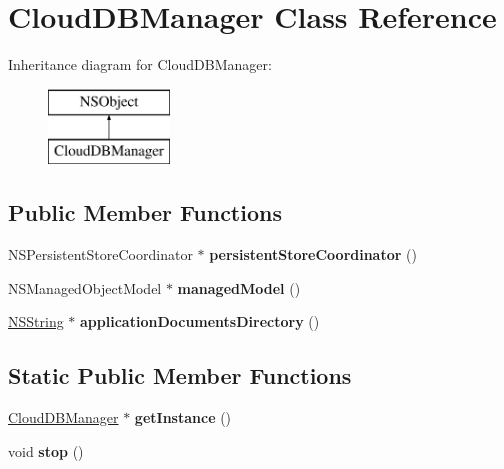 \hypertarget{interface_cloud_d_b_manager}{
\section{\-Cloud\-D\-B\-Manager \-Class \-Reference}
\label{interface_cloud_d_b_manager}
}
\-Inheritance diagram for \-Cloud\-D\-B\-Manager\-:\begin{figure}[H]
\begin{center}
\leavevmode
\includegraphics[height=2.000000cm]{interface_cloud_d_b_manager}
\end{center}
\end{figure}
\subsection*{\-Public \-Member \-Functions}
\begin{DoxyCompactItemize}
\item 
\hypertarget{interface_cloud_d_b_manager_a6cd9c78a9538f72c2a5948939c737094}{
\-N\-S\-Persistent\-Store\-Coordinator $\ast$ {\bfseries persistent\-Store\-Coordinator} ()}
\label{interface_cloud_d_b_manager_a6cd9c78a9538f72c2a5948939c737094}

\item 
\hypertarget{interface_cloud_d_b_manager_abbab662a92defb3dce9caed61b819bd0}{
\-N\-S\-Managed\-Object\-Model $\ast$ {\bfseries managed\-Model} ()}
\label{interface_cloud_d_b_manager_abbab662a92defb3dce9caed61b819bd0}

\item 
\hypertarget{interface_cloud_d_b_manager_a56d373e0130a6dafe8f6c35488c7a15d}{
\hyperlink{class_n_s_string}{\-N\-S\-String} $\ast$ {\bfseries application\-Documents\-Directory} ()}
\label{interface_cloud_d_b_manager_a56d373e0130a6dafe8f6c35488c7a15d}

\end{DoxyCompactItemize}
\subsection*{\-Static \-Public \-Member \-Functions}
\begin{DoxyCompactItemize}
\item 
\hypertarget{interface_cloud_d_b_manager_a53b92ff0a2cc27e6185d08a7137fd260}{
\hyperlink{interface_cloud_d_b_manager}{\-Cloud\-D\-B\-Manager} $\ast$ {\bfseries get\-Instance} ()}
\label{interface_cloud_d_b_manager_a53b92ff0a2cc27e6185d08a7137fd260}

\item 
\hypertarget{interface_cloud_d_b_manager_a2801eda75d1a0b653d16fab81e7076b2}{
void {\bfseries stop} ()}
\label{interface_cloud_d_b_manager_a2801eda75d1a0b653d16fab81e7076b2}

\end{DoxyCompactItemize}

